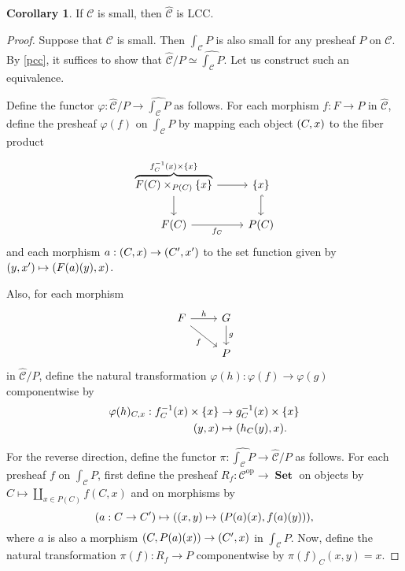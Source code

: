 \documentclass[10pt,letterpaper,cm]{nupset}
\theoremstyle{definition}
\theoremstyle{theorem}
\newtheorem{corollary}[definition]{Corollary}
\theoremstyle{remark}
\newcommand{\0}{\mathbf{0}}
\newcommand{\1}{\mathbf{1}}
\newcommand{\2}{\mathbf{2}}
\DeclareMathOperator{\op}{op}
\DeclareMathOperator{\set}{\mathbf{Set}}
\renewcommand{\c}{\mathscr{C}}
\begin{document}
\begin{corollary}
If $\c$ is small, then $\widehat{\c}$ is LCC.
\end{corollary}
\begin{proof}
Suppose that $\c$ is small. Then $\int_{\c}{P}$ is also small for any presheaf $P$ on $\c$. By \cref{pcc}, it suffices to show that $\widehat{\c}/P \simeq \widehat{\int_{\c}{P}}$. Let us construct such an equivalence.

\medskip

Define the functor $\varphi : \widehat{\c}/P \to \widehat{\int_{\c}{P}}$ as follows. For each morphism $f : F \to P$ in $\widehat{\c}$, define the presheaf $\varphi(f)$ on $\int_{\c}{P}$ by mapping each object $\mleft(C, x\mright)$ to the fiber product  
\[
\begin{tikzcd}
\overbrace{F(C) \times_{P(C)} \{x\}}^{f_C^{-1}(x) \times \{x\}} \arrow[d] \arrow[r] & \{x\} \arrow[d, hook] \\
F(C) \arrow[r, "f_C"']                       & P(C)                 
\end{tikzcd}
\] and each morphism $a: \mleft(C, x\mright) \to \mleft(C', x'\mright)$ to the set function given by $\mleft(y, x'\mright) \mapsto \mleft(F(a)(y), x\mright)$. 

\smallskip

Also, for each morphism 
\[
\begin{tikzcd}
F \arrow[r, "h"] \arrow[rd, "f"'] & G \arrow[d, "g"] \\
                                  & P               
\end{tikzcd}
\] in $\widehat{\c}/P$, define the natural transformation $\varphi(h) : \varphi(f) \to \varphi(g)$ componentwise by 
\begin{align*}
\varphi(h)_{C,x} :  f_C^{-1}(x) \times \{x\} & \to g_C^{-1}(x) \times \{x\}
\\   \mleft(y,x\mright)& \mapsto \mleft(h_C(y), x\mright)
.\end{align*}

\medskip

For the reverse direction, define the functor $\pi :  \widehat{\int_{\c}{P}} \to \widehat{\c}/P$ as follows. For each presheaf $f$ on $\int_{\c}{P}$, first define the presheaf $R_f : \c^{\op} \to \set$ on objects by $C \mapsto \coprod_{x\in P(C)}f(C, x)$ and on morphisms by $$\mleft(a : C \to C'\mright) \mapsto  \mleft(\mleft(x, y\mright) \mapsto \mleft(P(a)(x), f(a)(y)\mright) \mright),$$ where $a$ is also a morphism $\mleft(C,  P(a)(x)\mright) \to \mleft(C', x\mright)$ in $\int_{\c}{P}$. Now, define the natural transformation $\pi(f) : R_f \to P$ componentwise by $\pi(f)_C(x,y) = x$. 


\end{proof}
\end{document}
